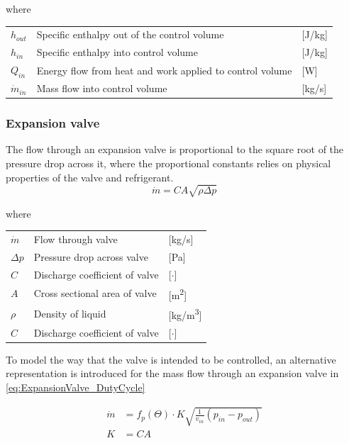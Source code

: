 where
\begin{center}
	\begin{tabular}{l p{8cm} l}
		$h_{out}$ 		& Specific enthalpy out of the control volume & [\si{J}/\si{kg}]\\ 
		$h_{in}$ 		& Specific enthalpy into control volume & [\si{J}/\si{kg}]\\ 
		$Q_{in}$ 		& Energy flow from heat and work applied to control volume & [\si{W}]\\
		$\dot{m}_{in}$ 	& Mass flow into control volume & [\si{kg}/\si{s}]\\
	\end{tabular}
\end{center}

\subsubsection{Expansion valve}
The flow through an expansion valve is proportional to the square root of the pressure drop across it, where the proportional constants relies on physical properties of the valve and refrigerant.
\begin{equation} \label{eq:ExpansionValve}
	\dot{m}= C A \sqrt{\rho\Delta p}
\end{equation}

where 
\begin{center}
	\begin{tabular}{l p{8cm} l}
		$\dot{m}$ 	& Flow through valve & [\si{kg}/\si{s}]\\ 
		$\Delta p$ 	& Pressure drop across valve & [\si{Pa}]\\
		$C$ 		& Discharge coefficient of valve & [$\cdot$]\\
		$A$	 		& Cross sectional area of valve & [\si{m^2}]\\
		$\rho$ 		& Density of liquid & [\si{kg}/\si{m^3}]\\
			$C$ 	& Discharge coefficient of valve & [$\cdot$]\\
	\end{tabular}
\end{center}

To model the way that the valve is intended to be controlled, an alternative representation is introduced for the mass flow through an expansion valve in \cref{eq:ExpansionValve_DutyCycle}


\begin{equation} \label{eq:ExpansionValve_DutyCycle} 
	\begin{split}
		\dot{m} &= f_p(\Theta) \cdot K  \sqrt{\frac{1}{v_{in}} (p_{in} - p_{out})}\\
		K 			&= C A
	\end{split}
\end{equation}

